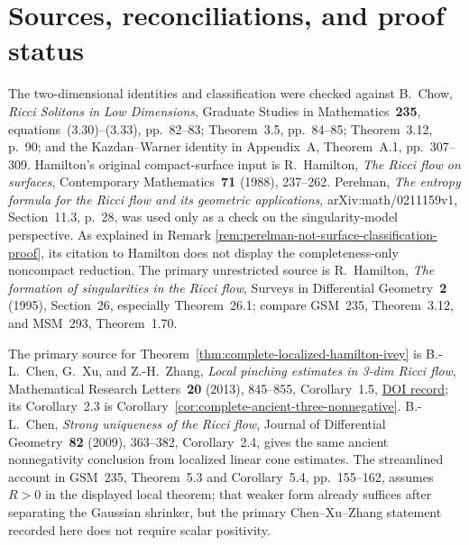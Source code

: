 \documentclass[10pt]{coll-l}
\theoremstyle{definition}
\theoremstyle{remark}
\numberwithin{section}{chapter}
\numberwithin{equation}{chapter}
\begin{document}
\section{Sources, reconciliations, and proof status}
\label{sec:shrinker-classification-sources}

The two-dimensional identities and classification were checked against
B.~Chow, \emph{Ricci Solitons in Low Dimensions}, Graduate Studies in
Mathematics~\textbf{235}, equations~(3.30)--(3.33), pp.~82--83;
Theorem~3.5, pp.~84--85; Theorem~3.12, p.~90; and the Kazdan--Warner
identity in Appendix~A, Theorem~A.1, pp.~307--309.  Hamilton's original
compact-surface input is R.~Hamilton, \emph{The Ricci flow on surfaces},
Contemporary Mathematics~\textbf{71} (1988), 237--262.  Perelman,
\emph{The entropy formula for the Ricci flow and its geometric
applications}, arXiv:math/0211159v1, Section~11.3, p.~28, was used only as
a check on the singularity-model perspective.  As explained in Remark
\ref{rem:perelman-not-surface-classification-proof}, its citation to
Hamilton does not display the completeness-only noncompact reduction.  The
primary unrestricted source is R.~Hamilton, \emph{The formation of
singularities in the Ricci flow}, Surveys in Differential
Geometry~\textbf{2} (1995), Section~26, especially Theorem~26.1; compare
GSM~235, Theorem~3.12, and MSM~293, Theorem~1.70.

The primary source for
Theorem~\ref{thm:complete-localized-hamilton-ivey} is B.-L.~Chen, G.~Xu,
and Z.-H.~Zhang, \emph{Local pinching estimates in 3-dim Ricci flow},
Mathematical Research Letters~\textbf{20} (2013), 845--855,
Corollary~1.5,
\href{https://doi.org/10.4310/MRL.2013.v20.n5.a3}{DOI record}; its
Corollary~2.3 is
Corollary~\ref{cor:complete-ancient-three-nonnegative}.  B.-L.~Chen,
\emph{Strong uniqueness of the Ricci flow}, Journal of Differential
Geometry~\textbf{82} (2009), 363--382, Corollary~2.4, gives the same ancient
nonnegativity conclusion from localized linear cone estimates.  The
streamlined account in GSM~235, Theorem~5.3 and Corollary~5.4,
pp.~155--162, assumes $R>0$ in the displayed local theorem; that weaker
form already suffices after separating the Gaussian shrinker, but the
primary Chen--Xu--Zhang statement recorded here does not require scalar
positivity.
\end{document}
